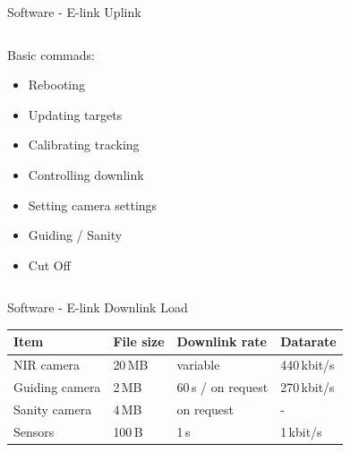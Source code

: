 \documentclass[11pt, aspectratio=169]{beamer}
\begin{document}
    \begin{frame}[c]{Software - E-link Uplink}
        \centering
        \begin{columns}[t]
            \begin{column}{.5\textwidth}
                Basic commads:
                \begin{itemize}
                    \item Rebooting
                    \item Updating targets
                    \item Calibrating tracking
                    \item Controlling downlink
                    \item Setting camera settings
                    \item Guiding / Sanity
                    \item Cut Off
                \end{itemize}
            \end{column}

            \begin{column}{.5\textwidth}
            \end{column}
        \end{columns}
    \end{frame}

    \begin{frame}[c]{Software - E-link Downlink Load}
        \centering
        \begin{tabular}{| l | l | l | l |}
            \hline
            \textbf{Item} & \textbf{File size} & \textbf{Downlink rate} & \textbf{Datarate} \\\hline\hline

            NIR camera        & 20\,MB    & variable              & 440\,kbit/s  \\\hline
            Guiding camera    & 2\,MB     & 60\,s / on request    & 270\,kbit/s  \\\hline
            Sanity camera     & 4\,MB     & on request            & -            \\\hline
            Sensors           & 100\,B    & 1\,s                  & 1\,kbit/s    \\\hline
        \end{tabular}
    \end{frame}
\end{document}
